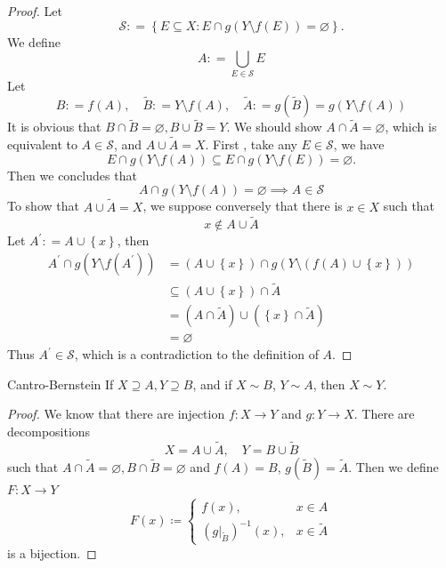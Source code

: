 \documentclass[../main.tex]{subfiles}
\begin{document}
\begin{proof}
    Let  \[
    \mathcal{S}: = \left\{ E\subseteq X: E\cap g\left( Y\setminus f\left( E \right)  \right) = \varnothing  \right\}.
    \] We define \[
    A: = \bigcup _{ E \in \mathcal{S}}E
    \] Let \[
    B: = f\left( A \right),\quad \tilde{B}: = Y\setminus f\left( A \right),\quad \tilde{A}: =  g\left( \tilde{B} \right)= g\left( Y\setminus f\left( A \right)  \right)    
    \] It is obvious that \(  B\cap \tilde{B}= \varnothing, B\cup \tilde{B}= Y  \). We should show \(  A\cap \tilde{A}= \varnothing  \), which is equivalent to \(  A\in \mathcal{S}  \),  and   \(  A\cup \tilde{A}= X  \).   First , take any \(  E \in \mathcal{S}  \), we have \[
    E\cap g\left( Y\setminus f\left( A \right)  \right)\subseteq E\cap g\left( Y\setminus f\left( E \right)  \right)= \varnothing  .
    \]Then we concludes that  \[
    A\cap g\left( Y\setminus f\left( A \right)  \right)= \varnothing\implies A\in \mathcal{S} 
    \] To show that \(  A\cup \tilde{A}= X  \), we suppose conversely that there is \(  x\in X  \) such that \[
    x \not \in A\cup \tilde{A}
    \]  Let \(  A^{\prime} : =  A\cup \left\{ x \right\}  \), then \[
   \begin{aligned}
   A^{\prime} \cap g\left( Y\setminus f\left( A^{\prime}  \right)  \right)&= \left( A\cup \left\{ x \right\} \right)\cap g\left( Y\setminus \left( f\left( A \right)\cup \left\{ x \right\}  \right)  \right)  \\ 
    &\subseteq \left( A\cup \left\{ x \right\} \right)\cap \tilde{A} \\ 
    &= \left( A\cap \tilde{A}  \right) \cup \left( \left\{ x \right\}\cap \tilde{A} \right)     \\ 
     &= \varnothing
   \end{aligned}
    \] Thus \(  A^{\prime} \in \mathcal{S}  \), which is a contradiction to the definition of \(  A  \).  
\end{proof}


\begin{theorem}{Cantro-Bernstein}{}
    If \(  X\supseteq A, Y\supseteq B  \),  and if \(  X\sim B  \), \(  Y\sim A  \), then \(  X \sim Y  \).    
\end{theorem}

\begin{proof}
    We know that there are injection \(  f :X\to Y   \) and \(  g:Y\to X  \). There are decompositions  \[
    X= A\cup \tilde{A},\quad Y= B\cup \tilde{B}
    \]such that \(  A\cap \tilde{A}= \varnothing, B\cap \tilde{B}= \varnothing  \) and \(  f\left( A \right)= B   \), \(  g\left( \tilde{B} \right)= \tilde{A}  \).     Then we define \(  F:X\to Y  \) \[
    F\left( x \right)\coloneqq \begin{cases} f\left( x \right),& x \in A\\ 
     \left( g|_{\tilde{B}} \right) ^{-1} \left( x \right) ,& x \in \tilde{A}   \end{cases}  
    \] is a bijection.
\end{proof}
\end{document}
